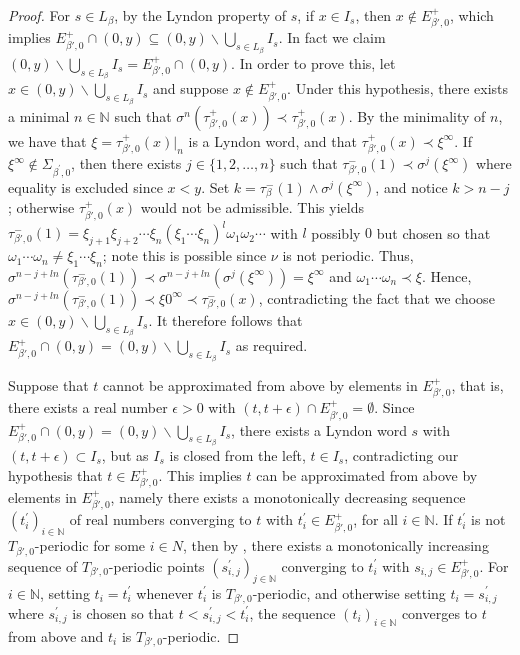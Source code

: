 \documentclass[a4paper,reqno,10pt]{amsart}
\begin{document}
\begin{proof}
For $s \in L_{\beta}$, by the Lyndon property of $s$, if $x \in I_s$, then $x \not\in E_{\beta',0}^{+}$, which implies $E_{\beta',0}^{+} \cap (0,y) \subseteq (0,y) \backslash \bigcup_{s\in L_\beta} I_s$.  In fact we claim $(0,y) \backslash \bigcup_{s\in L_\beta} I_s = E_{\beta',0}^+ \cap (0,y)$. In order to prove this, let $x\in (0,y) \backslash \bigcup_{s\in L_\beta} I_s$ and suppose $x \notin E_{\beta',0}^+$.  Under this hypothesis, there exists a minimal $n \in \mathbb{N}$ such that $\sigma^{n}(\tau_{\beta', 0}^{+}(x)) \prec \tau_{\beta', 0}^{+}(x)$.  By the minimality of $n$, we have that $\xi = \tau_{\beta', 0}^{+}(x)\vert_{n}$ is a Lyndon word, and that $\tau_{\beta', 0}^{+}(x) \prec \xi^{\infty}$. If $\xi^\infty \not\in \Sigma_{\beta^\prime,0}$, then there exists $j \in \{ 1, 2, \ldots, n \}$ such that $\tau_{\beta',0}^{-}(1)\prec\sigma^j(\xi^\infty)$ where equality is excluded since $x<y$. Set $k = \tau_\beta^{-}(1) \wedge \sigma^j(\xi^\infty)$, and notice $k>n-j$; otherwise $\tau_{\beta', 0}^{+}(x)$ would not be admissible. This yields $\tau_{\beta',0}^{-}(1)=\xi_{j+1}\xi_{j+2}\cdots \xi_n (\xi_1\cdots \xi_n)^l \omega_1 \omega_2 \cdots$ with $l$ possibly $0$ but chosen so that $\omega_1 \cdots \omega_n \neq \xi_1 \cdots \xi_n$; note this is possible since $\nu$ is not periodic. Thus, $\sigma^{n-j+ln}(\tau_{\beta',0}^{-}(1)) \prec \sigma^{n-j+ln}(\sigma^{j}(\xi^\infty))=\xi^\infty$ and $\omega_1\cdots \omega_n \prec \xi$.  Hence, $\sigma^{n-j+ln}(\tau_{\beta',0}^{-}(1)) \prec \xi 0^\infty \prec \tau_{\beta',0}^{-}(x)$, contradicting the fact that we choose $x\in (0,y) \backslash \bigcup_{s\in L_\beta} I_s$. It therefore follows that $E_{\beta',0}^{+} \cap (0,y) = (0,y) \backslash \bigcup_{s\in L_\beta} I_s$ as required.

Suppose that $t$ cannot be approximated from above by elements in $E_{\beta',0}^+$, that is, there exists a real number $\epsilon > 0$ with $(t,t+\epsilon)\cap E_{\beta',0}^+=\emptyset$. Since $E_{\beta',0}^+ \cap (0,y) = (0,y) \backslash \bigcup_{s\in L_\beta} I_s$, there exists a Lyndon word $s$ with $(t,t+\epsilon) \subset I_s$, but as $I_s$ is closed from the left, $t\in I_s$, contradicting our hypothesis that $t\in E_{\beta',0}^{+}$. This implies $t$ can be approximated from above by elements in $E_{\beta',0}^{+}$, namely there exists a monotonically decreasing sequence $(t_i^\prime)_{i\in \mathbb{N}}$ of real numbers converging to $t$ with $t_i^\prime \in E_{\beta',0}^+$, for all $i \in \mathbb{N}$. If $t_i^\prime$ is not $T_{\beta',0}$-periodic for some $i \in \mathbb{}N$, then by \cite[Lemmanta~3.4 and~3.5]{KKLL}, there exists a monotonically increasing sequence of $T_{\beta',0}$-periodic points $(s_{i, j}^\prime)_{j \in \mathbb{N}}$ converging to $t_i^\prime$ with $s_{i, j} \in E_{\beta',0}^+$. For $i \in \mathbb{N}$, setting $t_i=t_i^\prime$ whenever $t_i^\prime$ is $T_{\beta',0}$-periodic, and otherwise setting $t_i=s_{i,j}^\prime$ where $s_{i,j}^\prime$ is chosen so that  $t < s_{i,j}^\prime < t_i^\prime$, the sequence $(t_i)_{i \in \mathbb{N}}$ converges to $t$ from above and $t_i$ is $T_{\beta',0}$-periodic.


\end{proof}
\end{document}
